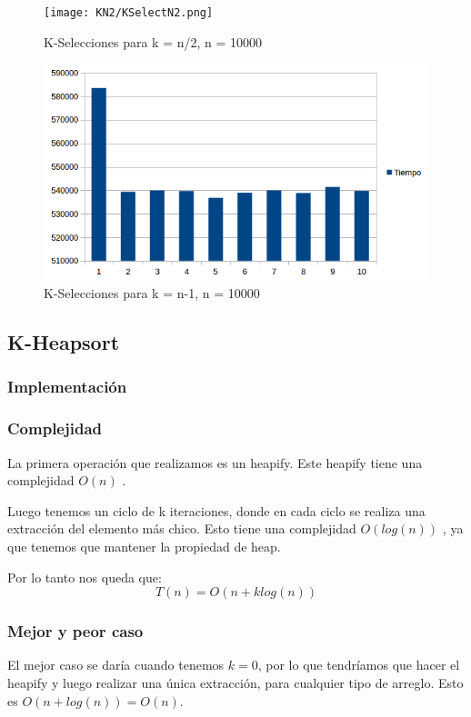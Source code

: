 \begin{figure}[H]
\centering
\texttt{[image: KN2/KSelectN2.png]}
\caption{K-Selecciones para k = n/2, n = 10000}
\end{figure}

\begin{figure}[H]
\centering
\includegraphics[width=\textwidth]{KN/KSelectN.png}
\caption{K-Selecciones para k = n-1, n = 10000}
\end{figure}


\newpage
\subsection{K-Heapsort}

\subsubsection{Implementación}

\subsubsection{Complejidad}
La primera operación que realizamos es un heapify. Este heapify tiene una complejidad $O(n)$ \cite{STD_MAKEHEAP}.

Luego tenemos un ciclo de k iteraciones, donde en cada ciclo se realiza una extracción del elemento más chico. Esto tiene una complejidad $O(log(n))$ \cite{STD_POPHEAP}, ya que tenemos que mantener la propiedad de heap.

Por lo tanto nos queda que:
$$ T(n) = O(n + klog(n)) $$

\subsubsection{Mejor y peor caso}
El mejor caso se daría cuando tenemos $k = 0$, por lo que tendríamos que hacer el heapify y luego realizar una única extracción, para cualquier tipo de arreglo. Esto es $O(n + log(n)) = O(n)$.

